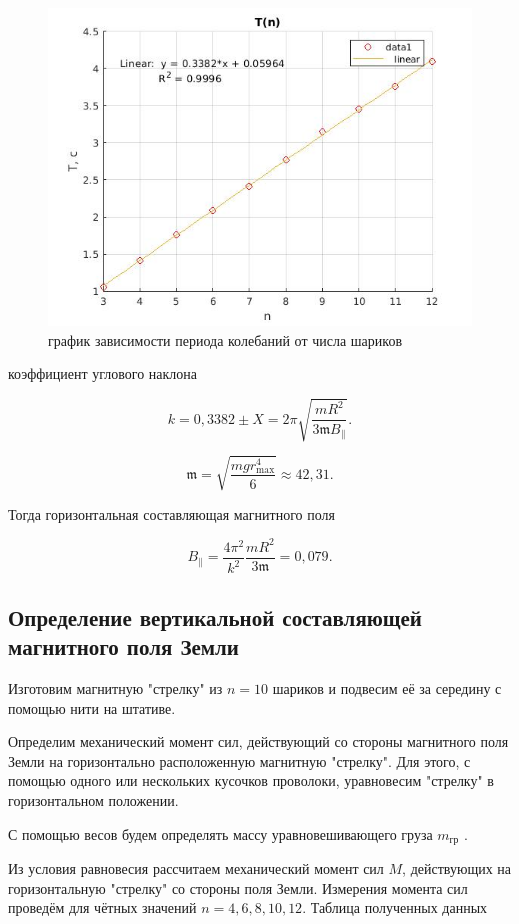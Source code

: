 \documentclass[a4paper, 12pt]{article}%
\begin{document}
\begin{figure}[h]
    \centering
    \includegraphics[width = 9 cm]{graph1_s.jpg}
    \caption{график зависимости периода колебаний от числа шариков}
    \label{msh1}
\end{figure}

коэффициент углового наклона 

\[k = 0,3382 \pm X= 2\pi \sqrt{\frac{m R^{2}}{3 \mathfrak{m} B_{\|}}} . \]

\[\mathfrak{m}=\sqrt{\frac{m g r_{\max }^{4}}{6}} \approx 42,31 . \]

Тогда горизонтальная составляющая магнитного поля 

\[B_{\|} = \frac{4\pi^2}{k^2}\frac{mR^2}{3\mathfrak{m}} = 0,079. \]

\subsection{Определение вертикальной составляющей магнитного поля Земли}

Изготовим магнитную "стрелку" из $n = 10$ шариков и подвесим её за середину с помощью нити на штативе. 

Определим механический момент сил, действующий со стороны магнитного поля Земли на горизонтально расположенную магнитную "стрелку". Для этого, с помощью одного или нескольких кусоч­ков проволоки, уравновесим "стрелку" в горизонтальном положении.

С помощью весов будем определять массу уравновешивающего груза $m_{\text{гр}}$ .

Из условия равновесия рассчитаем механический момент сил $M$, действующих на горизонтальную "стрелку" со стороны поля Земли. Измерения момента сил проведём для чётных значений $n = 4, 6, 8, 10, 12$. Таблица полученных данных
\end{document}
